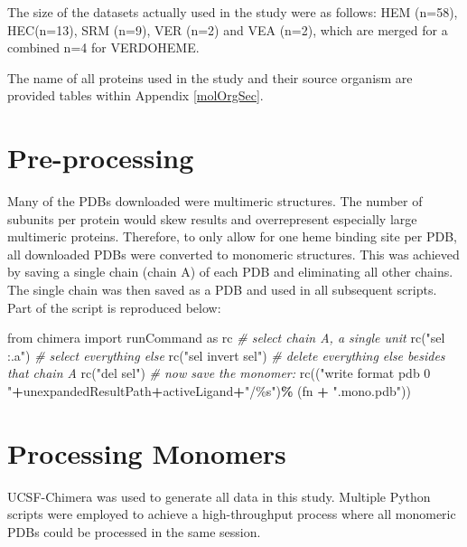\documentclass[a4paper, nobind]{templates/ociamthesis}
\newenvironment{Shaded}{\begin{snugshade}}{\end{snugshade}}
\newcommand{\CommentTok}[1]{\textcolor[rgb]{0.56,0.35,0.01}{\textit{#1}}}
\newcommand{\ImportTok}[1]{#1}
\newcommand{\NormalTok}[1]{#1}
\newcommand{\OperatorTok}[1]{\textcolor[rgb]{0.81,0.36,0.00}{\textbf{#1}}}
\newcommand{\SpecialCharTok}[1]{\textcolor[rgb]{0.00,0.00,0.00}{#1}}
\newcommand{\StringTok}[1]{\textcolor[rgb]{0.31,0.60,0.02}{#1}}
\renewenvironment{Shaded}
{
  \vspace{10pt}%
  \begin{snugshade}%
}{%
  \end{snugshade}%
  \vspace{8pt}%
}
\begin{document}
The size of the datasets actually used in the study were as follows: HEM (n=58), HEC(n=13), SRM (n=9), VER (n=2) and VEA (n=2), which are merged for a combined n=4 for VERDOHEME.

The name of all proteins used in the study and their source organism are provided tables within Appendix \ref{molOrgSec}.

\hypertarget{pre-processing}{%
\section{Pre-processing}\label{pre-processing}}

Many of the PDBs downloaded were multimeric structures. The number of subunits per protein would skew results and overrepresent especially large multimeric proteins. Therefore, to only allow for one heme binding site per PDB, all downloaded PDBs were converted to monomeric structures. This was achieved by saving a single chain (chain A) of each PDB and eliminating all other chains. The single chain was then saved as a PDB and used in all subsequent scripts. Part of the script is reproduced below:

\begin{Shaded}
\begin{Highlighting}[]
\ImportTok{from}\NormalTok{ chimera }\ImportTok{import}\NormalTok{ runCommand }\ImportTok{as}\NormalTok{ rc}
\CommentTok{\# select chain A, a single unit}
\NormalTok{rc(}\StringTok{"sel :.a"}\NormalTok{)}
\CommentTok{\# select everything else}
\NormalTok{rc(}\StringTok{"sel invert sel"}\NormalTok{)}
\CommentTok{\# delete everything else besides that chain A}
\NormalTok{rc(}\StringTok{"del sel"}\NormalTok{)}
\CommentTok{\# now save the monomer:}
\NormalTok{rc((}\StringTok{"write format pdb 0 "}\OperatorTok{+}\NormalTok{unexpandedResultPath}\OperatorTok{+}\NormalTok{activeLigand}\OperatorTok{+}\StringTok{"/}\SpecialCharTok{\%s}\StringTok{"}\NormalTok{)}\OperatorTok{\%}
\NormalTok{  (fn }\OperatorTok{+} \StringTok{".mono.pdb"}\NormalTok{))}
\end{Highlighting}
\end{Shaded}

\hypertarget{processing-monomers}{%
\section{Processing Monomers}\label{processing-monomers}}

UCSF-Chimera was used to generate all data in this study. Multiple Python scripts were employed to achieve a high-throughput process where all monomeric PDBs could be processed in the same session.
\end{document}
